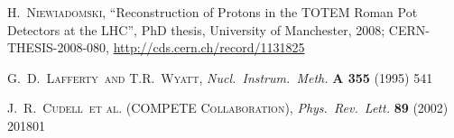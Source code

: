 \documentclass[TOTEM]{cern/cernphprep}
\def\etal{et al.}
\def\etal{et al.}
\def\Name#1{\textsc{#1}, }
\def\REVIEW#1#2#3#4{{\it #1} {\bf #2} (#3) #4}
\begin{document}
\begin{thebibliography}{99}
	\Name{H.~Niewiadomski}
	``Reconstruction of Protons in the TOTEM Roman Pot Detectors at the LHC'',
    PhD thesis, University of Manchester, 2008;
    CERN-THESIS-2008-080,
	\url{http://cds.cern.ch/record/1131825}

	\Name{G.~D.~Lafferty~and T.R.~Wyatt}
	\REVIEW{Nucl.\ Instrum.\ Meth.}{A 355}{1995}{541}

	\Name{J.~R.~Cudell~\etal{} (COMPETE Collaboration)}
	\REVIEW{Phys.\ Rev.\ Lett.}{89}{2002}{201801}

\end{thebibliography}
\end{document}
